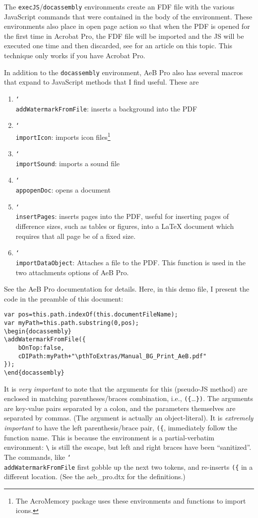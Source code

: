 \documentclass{article}
\def\pthToExtras{../extras}
\newcommand{\cs}[1]{\texttt{\char`\\#1}}
\begin{document}
The \texttt{execJS}/\texttt{docassembly} environments create an FDF
file with the various JavaScript commands that were contained in the
body of the environment. These environments also place in open page
action so that when the PDF is opened for the first time in Acrobat
Pro, the FDF file will be imported and the JS will be executed one
time and then discarded, see \cite{TUG:execJS} for an article on this topic.
This technique only works if you have Acrobat Pro.

In addition to the \texttt{docassembly} environment, AeB Pro also
has several macros that expand to JavaScript methods that I find
useful. These are
\begin{enumerate}
    \item \cs{addWatermarkFromFile}: inserts a background into the PDF

    \item \cs{importIcon}: imports icon files\footnote{The
    AcroMemory package uses these environments and functions to
    import icons.}

    \item \cs{importSound}: imports a sound file

    \item \cs{appopenDoc}: opens a document

    \item \cs{insertPages}: inserts pages into the PDF, useful for
    inserting pages of difference sizes, such as tables or figures,
    into a {\LaTeX} document which requires that all page be of a
    fixed size.

    \item \cs{importDataObject}: Attaches a file to the PDF. This
    function is used in the two attachments options of AeB Pro.
\end{enumerate}
See the AeB Pro documentation for details.  Here, in this demo file,
I present the code in the preamble of this document:
\begin{Verbatim}
var pos=this.path.indexOf(this.documentFileName);
var myPath=this.path.substring(0,pos);
\begin{docassembly}
\addWatermarkFromFile({
    bOnTop:false,
    cDIPath:myPath+"\pthToExtras/Manual_BG_Print_AeB.pdf"
});
\end{docassembly}
\end{Verbatim}
It is \emph{very important} to note that the arguments for this
(pseudo-JS method) are enclosed in matching parentheses/braces
combination, i.e., \verb!({!\dots\verb!})!. The arguments are
key-value pairs separated by a colon, and the parameters themselves
are separated by commas. (The argument is actually an
object-literal).  It is \emph{extremely important} to have the left
parenthesis/brace pair, \verb!({!, immediately follow the function
name. This is because the environment is a partial-verbatim
environment: \verb!\! is still the escape, but left and right braces
have been ``sanitized''.  The commands, like
\cs{addWatermarkFromFile} first gobble up the next two tokens, and
re-inserts \verb!({! in a different location. (See the
\textsf{aeb\_pro.dtx} for the definitions.)
\end{document}
